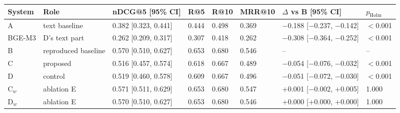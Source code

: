 \begin{adjustbox}{max width=\linewidth}
\begin{tabular}{llllllll}
\toprule
System & Role & nDCG@5 [95\% CI] & R@5 & R@10 & MRR@10 & $\Delta$ vs B [95\% CI] & $p_\mathrm{Holm}$ \\
\midrule
A & text baseline & 0.382 [0.323, 0.441] & 0.444 & 0.498 & 0.369 & $-$0.188 [$-$0.237, $-$0.142] & $<$0.001 \\
BGE-M3 & D's text part & 0.262 [0.209, 0.317] & 0.307 & 0.418 & 0.262 & $-$0.308 [$-$0.364, $-$0.252] & $<$0.001 \\
B & reproduced baseline & 0.570 [0.510, 0.627] & 0.653 & 0.680 & 0.546 & -- & -- \\
C & proposed & 0.516 [0.457, 0.574] & 0.618 & 0.667 & 0.489 & $-$0.054 [$-$0.076, $-$0.032] & $<$0.001 \\
D & control & 0.519 [0.460, 0.578] & 0.609 & 0.667 & 0.496 & $-$0.051 [$-$0.072, $-$0.030] & $<$0.001 \\
C$_w$ & ablation E & 0.571 [0.511, 0.629] & 0.653 & 0.680 & 0.547 & +0.001 [$-$0.002, +0.005] & 1.000 \\
D$_w$ & ablation E & 0.570 [0.510, 0.627] & 0.653 & 0.680 & 0.546 & +0.000 [+0.000, +0.000] & 1.000 \\
\bottomrule
\end{tabular}
\end{adjustbox}
\par{}
